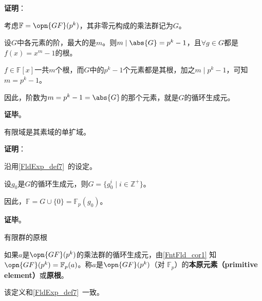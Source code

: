 \textbf{证明}：

考虑$\mathbb{F}=\opn{GF}(p^k)$，其非零元构成的乘法群记为$G$。

设$G$中各元素的阶，最大的是$m$。则$m\mid \abs{G} = p^k-1$，且$\forall g\in G$都是$f(x)=x^m-1$的根。

$f\in\mathbb{F}[x]$一共$m$个根，而$G$中的$p^k-1$个元素都是其根，加之$m\mid p^k-1$，可知$m=p^k-1$。

因此，阶数为$m=p^k-1=\abs{G}$的那个元素，就是$G$的循环生成元。

\textbf{证毕}。

\begin{corollary}{}\label{FntFld_cor1}
有限域是其素域的单扩域。
\end{corollary}

\textbf{证明}：

沿用\autoref{FldExp_def7}~的设定。

设$g_0$是$G$的循环生成元，则$G=\{g_0^i\mid i\in\mathbb{Z}^+\}$。

因此，$\mathbb{F}=G\cup\{0\}=\mathbb{F}_p(g_0)$。

\textbf{证毕}。

\begin{definition}{有限群的原根}

如果$a$是$\opn{GF}(p^k)$的乘法群的循环生成元，由\autoref{FntFld_cor1} 知$\opn{GF}(p^k)=\mathbb{F}_p(a)$。称$a$是$\opn{GF}(p^k)$（对 $\mathbb{F}_p$）的\textbf{本原元素（primitive element）}或\textbf{原根}。

该定义和\autoref{FldExp_def7}~一致。

\end{definition}

